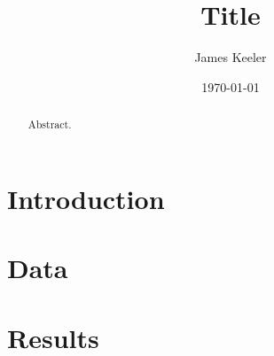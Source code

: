 \documentclass[12pt]{article}
\title{Title}
\author{James Keeler}
\date{\today}
\begin{document}
\maketitle

\begin{abstract}
Abstract.
\end{abstract}

\section{Introduction}

\section{Data}

\section{Results}



\end{document}
